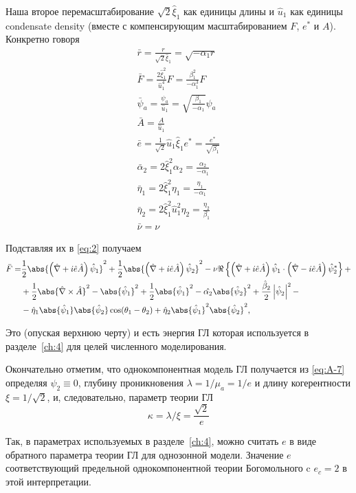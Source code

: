 Наша второе перемасштабирование \( \sqrt{2}\hat{\xi}_1 \) как единицы длины
и \( \hat{u}_1 \) как единицы condensate density (вместе с компенсирующим
масштабированием \( F \), \( e^* \) и \( A \)). Конкретно говоря
\begin{gather}
	\bar{r} = \frac{r}{\sqrt{2}\hat{\xi}_1} = \sqrt{-\alpha_1 r} \nonumber \\
	\bar{F} = \frac{2\hat{\xi}^2_1}{\hat{u}^4_1}F =
		\frac{\beta^2_1}{-\alpha^3_1}F \nonumber \\
	\bar{\psi}_a = \frac{\psi_a}{\hat{u}_1} =
		\sqrt{\frac{\beta_1}{-\alpha_1}}\psi_a \nonumber \\
	\bar{A} = \frac{A}{\hat{u}_1} \\
	\bar{e} = \frac{1}{\sqrt{2}}\hat{u}_1\hat{\xi}_1 e^* =
		\frac{e^*}{\sqrt{\beta_1}} \nonumber \\
	\bar{\alpha}_2 = 2\hat{\xi}^2_1 \alpha_2 = \frac{\alpha_2}{-\alpha_1}
	  \nonumber \\
	\bar{\eta}_1 = 2\hat{\xi}^2_1 \eta_1 = \frac{\eta_1}{-\alpha_1} \nonumber \\
	\bar{\eta}_2 = 2\hat{\xi}^2_1 \hat{u}^2_1 \eta_2 =
		\frac{\eta_2}{\beta_1} \nonumber \\
	\bar{\nu} = \nu \label{eq:A-6}
\end{gather}

Подставляя их в \eqref{eq:2} получаем
\begin{align}
	\bar{F} = & \frac{1}{2}\abs{\left( \hat{\nabla} + i\hat{e}\hat{A} \right)
	  \hat{\psi}_1}^2 + \frac{1}{2}\abs{\left( \hat{\nabla} + i\hat{e}\hat{A}
	  \right)\hat{\psi}_2}^2 - \nu\Re\left\{ \left( \hat{\nabla} + i\hat{e}\hat{A}
	  \right) \hat{\psi}_1 \cdot \left( \hat{\nabla} - i\hat{e}\hat{A} \right)
		\hat{\psi}^*_2 \right\} + \nonumber \\
  & + \frac{1}{2}\abs{\hat{\nabla}\times\hat{A}}^2 - \abs{\hat{\psi}_1}^2 +
		\frac{1}{2}\abs{\hat{\psi}_1}^2 - \hat{\alpha_2}\abs{\hat{\psi}_2}^2 +
		\frac{\hat{\beta}_2}{2}\left| \hat{\psi}_2 \right|^2 - \nonumber \\
  & - \hat{\eta}_1\abs{\hat{\psi}_1}\abs{\hat{\psi}_2} \cos(\theta_1 - \theta_2)
    + \hat{\eta}_2\abs{\hat{\psi}_1}^2 \abs{\hat{\psi}_2}^2, \label{eq:A-7}
\end{align}

Это (опуская верхнюю черту) и есть энергия ГЛ которая
используется в разделе~\ref{ch:4} для целей численного моделирования.

Окончательно отметим, что однокомпонентная модель ГЛ получается
из \eqref{eq:A-7} определяя \( \psi_2 \equiv 0 \), глубину проникновения
\( \lambda = 1/\mu_a = 1/e \) и длину когерентности
\( \xi = 1/\sqrt{2} \), и, следовательно, параметр теории ГЛ
\begin{equation}
	\kappa = \lambda/\xi = \frac{\sqrt{2}}{e}
	\label{eq:A-8}
\end{equation}

Так, в параметрах используемых в разделе~\ref{ch:4}, можно считать \( e \) в виде
обратного параметра теории ГЛ для однозонной модели. Значение \( e \)
соответствующий предельной однокомпонентной теории Богомольного c
\( e_c = 2 \) в этой интерпретации.
